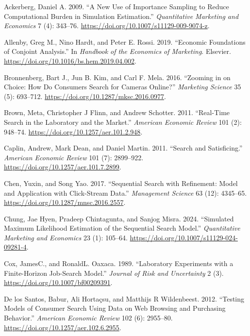 \documentclass[
  letterpaper,
  DIV=11,
  numbers=noendperiod]{scrartcl}
\newlength{\cslhangindent}
\newenvironment{CSLReferences}[2] %
 {\begin{list}{}{%
  \setlength{\itemindent}{0pt}
  \setlength{\leftmargin}{0pt}
  \setlength{\parsep}{0pt}
  \ifodd #1
   \setlength{\leftmargin}{\cslhangindent}
   \setlength{\itemindent}{-1\cslhangindent}
  \fi
  \setlength{\itemsep}{#2\baselineskip}}}
 {\end{list}}
\begin{document}
\protect{}\label{refs}
\begin{CSLReferences}{1}{1}
Ackerberg, Daniel A. 2009. {``A New Use of Importance Sampling to Reduce
Computational Burden in Simulation Estimation.''} \emph{Quantitative
Marketing and Economics} 7 (4): 343--76.
\url{https://doi.org/10.1007/s11129-009-9074-z}.

Allenby, Greg M., Nino Hardt, and Peter E. Rossi. 2019. {``Economic
Foundations of Conjoint Analysis.''} In \emph{Handbook of the Economics
of Marketing}. Elsevier.
\url{https://doi.org/10.1016/bs.hem.2019.04.002}.

Bronnenberg, Bart J., Jun B. Kim, and Carl F. Mela. 2016. {``Zooming in
on Choice: How Do Consumers Search for Cameras Online?''}
\emph{Marketing Science} 35 (5): 693--712.
\url{https://doi.org/10.1287/mksc.2016.0977}.

Brown, Meta, Christopher J Flinn, and Andrew Schotter. 2011.
{``Real-Time Search in the Laboratory and the Market.''} \emph{American
Economic Review} 101 (2): 948--74.
\url{https://doi.org/10.1257/aer.101.2.948}.

Caplin, Andrew, Mark Dean, and Daniel Martin. 2011. {``Search and
Satisficing.''} \emph{American Economic Review} 101 (7): 2899--922.
\url{https://doi.org/10.1257/aer.101.7.2899}.

Chen, Yuxin, and Song Yao. 2017. {``Sequential Search with Refinement:
Model and Application with Click-Stream Data.''} \emph{Management
Science} 63 (12): 4345--65.
\url{https://doi.org/10.1287/mnsc.2016.2557}.

Chung, Jae Hyen, Pradeep Chintagunta, and Sanjog Misra. 2024.
{``Simulated Maximum Likelihood Estimation of the Sequential Search
Model.''} \emph{Quantitative Marketing and Economics} 23 (1): 105--64.
\url{https://doi.org/10.1007/s11129-024-09281-4}.

Cox, JamesC., and RonaldL. Oaxaca. 1989. {``Laboratory Experiments with
a Finite-Horizon Job-Search Model.''} \emph{Journal of Risk and
Uncertainty} 2 (3). \url{https://doi.org/10.1007/bf00209391}.

De los Santos, Babur, Ali Hortaçsu, and Matthijs R Wildenbeest. 2012.
{``Testing Models of Consumer Search Using Data on Web Browsing and
Purchasing Behavior.''} \emph{American Economic Review} 102 (6):
2955--80. \url{https://doi.org/10.1257/aer.102.6.2955}.


\end{CSLReferences}
\end{document}

